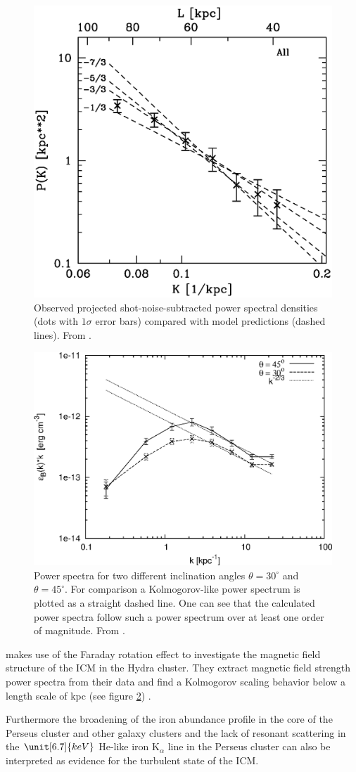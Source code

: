 \begin{figure}[tp]
\centering
\includegraphics[width=0.7\linewidth]{chapter8/1039fg12.eps}
\caption{Observed projected shot-noise-subtracted 
power spectral densities (dots with $1\sigma$ error bars) compared with model
predictions (dashed lines). From \citet{Schuecker2004}.}
\label{fig:schuecker}
\end{figure}
\begin{figure}[tp]
\centering
\includegraphics[width=0.7\linewidth]{chapter8/fig7.eps}
\caption{Power spectra for two different
inclination angles $\theta = 30^\circ$ and $\theta = 45^\circ$.
For comparison a Kolmogorov-like power spectrum is
plotted as a straight dashed line. One can see that the calculated
power spectra follow such a power spectrum over at least one order of
magnitude. From \citet{Vogt2005}.}
\label{fig:vogt}
\end{figure}

\citet{Vogt2005} makes
use of the Faraday rotation effect to investigate the magnetic field structure
of the ICM in the Hydra cluster. They extract magnetic field strength power
spectra from their data and find a Kolmogorov scaling behavior below a
length scale of \unit[1]{kpc} (see figure \ref{fig:vogt}) . 

Furthermore the broadening of the iron abundance profile
in the core of the Perseus cluster \citep{Rebusco2005} and other galaxy
clusters \citep{Rebusco2006} and the lack of 
resonant scattering in the $\unit[6.7]{keV}$ He-like iron K$_{\alpha}$ line in
the Perseus cluster \citep{Churazov2004} can also be interpreted as evidence for
the turbulent state of the ICM. 


 

 
